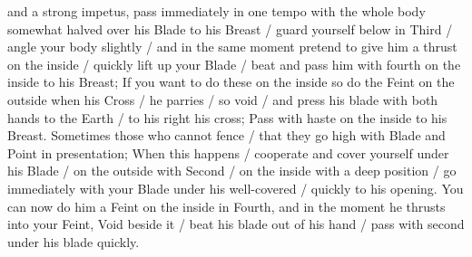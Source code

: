 \newpage


\newpage


and a strong impetus, pass immediately in one tempo with the whole
body somewhat halved over his Blade to his Breast / guard yourself
below in Third / angle your body slightly / and in the same moment
pretend to give him a thrust on the inside / quickly lift up 
your Blade / beat and pass him with fourth on the inside to
his Breast; If you want to do these on the inside so do the Feint on
the outside when his Cross / he parries / so void / and press his
blade with both hands to the Earth / to his right his cross; Pass with
haste on the inside to his Breast. Sometimes those who cannot fence /
that they go high with Blade and Point in presentation; When this
happens / cooperate and cover yourself under his Blade / on the
outside with Second / on the inside with a deep position / go
immediately with your Blade under his well-covered / quickly to his
opening. You can now do him a Feint on the inside in Fourth, and in the
moment he thrusts into your Feint, Void beside it / beat his blade
out of his hand / pass with second under his blade quickly.


